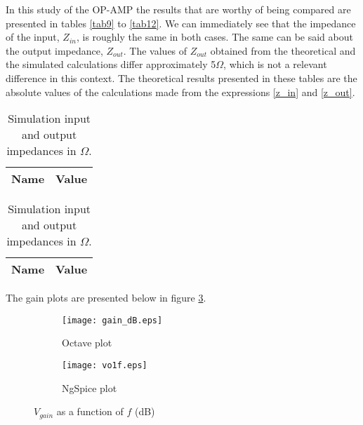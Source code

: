 In this study of the OP-AMP the results that are worthy of being compared are presented in tables \ref{tab9} to \ref{tab12}. We can immediately see that the impedance of the input, $Z_{in}$, is roughly the same in both cases.
The same can be said about the output impedance, $Z_{out}$. The values of $Z_{out}$ obtained from the theoretical and the simulated calculations differ approximately 5$\Omega$, which is not a relevant difference in this context. The theoretical results presented in these tables are the absolute values of the calculations made from the expressions \ref{z_in} and \ref{z_out}.


\begin{table}[H]
\parbox{.5\linewidth}{
\centering                
\def\arraystretch{1}        %

\begin{tabular}{c|c}        %
\hline                      %

\textbf{Name}  & \textbf{Value}\\     
\hline                      %

\hline                      %
\end{tabular}
\captionsetup{justification=justified, margin=0.5cm} 
\caption{Theoretical input and output impedances in $\Omega$.}
\label{tab9}
}
\hfill
\parbox{.5\linewidth}{
\centering
\def\arraystretch{1}

\begin{tabular}{c|c}
\hline    
\textbf{Name} & \textbf{Value} \\ \hline

\hline
\end{tabular}
\captionsetup{justification=justified, margin=0.5cm} 
\caption{Simulation input and output impedances in $\Omega$.}
\label{tab10}
}
\end{table}

The gain plots are presented below in figure \ref{gain_total}.
\begin{figure}[H]
\centering
\begin{subfigure}{0.5\textwidth}
  \centering
  \texttt{[image: gain\_dB.eps]}
  \caption{Octave plot}
  \label{gain_octave}
\end{subfigure}%
\begin{subfigure}{.5\textwidth}
  \centering
  \texttt{[image: vo1f.eps]}
  \caption{NgSpice plot}
  \label{gain_ngspice}
\end{subfigure}
\caption{$V_{gain}$ as a function of $f$ (dB)}
\label{gain_total}
\end{figure}

